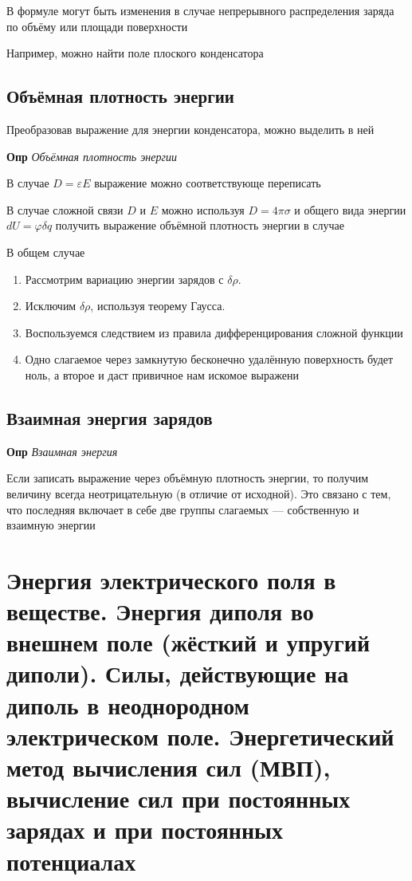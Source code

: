 \documentclass[a4paper, 14pt]{article}
\begin{document}
    В формуле могут быть изменения в случае непрерывного распределения заряда по объёму или площади поверхности
    
    Например, можно найти поле плоского конденсатора
    
    \subsection{Объёмная плотность энергии}
    
    Преобразовав выражение для энергии конденсатора, можно выделить в ней
    
    \textbf{Опр} \textit{Объёмная плотность энергии}
    
    В случае $D = \varepsilon E$ выражение можно соответствующе переписать
    
    В случае сложной связи $D$ и $E$ можно используя $D = 4 \pi \sigma$ и общего вида энергии $dU = \varphi \delta q$ получить выражение
    объёмной плотность энергии в случае
    
    В общем случае
    
    \begin{enumerate}
        \item Рассмотрим вариацию энергии зарядов с $\delta \rho$.
        \item Исключим $\delta \rho$, используя теорему Гаусса.
        \item Воспользуемся следствием из правила дифференцирования сложной функции
        \item Одно слагаемое через замкнутую бесконечно удалённую поверхность будет ноль, а второе и даст привичное
        нам искомое выражени
    \end{enumerate}
    
    \subsection{Взаимная энергия зарядов}
    
    \textbf{Опр} \textit{Взаимная энергия}
    
    Если записать выражение через объёмную плотность энергии, то получим величину всегда неотрицательную (в отличие
    от исходной).
    Это связано с тем, что последняя включает в себе две группы слагаемых --- собственную и взаимную энергии
    
    \section{Энергия электрического поля в веществе.
    Энергия диполя во внешнем поле (жёсткий и упругий диполи).
    Силы, действующие на диполь в неоднородном электрическом поле.
    Энергетический метод вычисления сил (МВП), вычисление сил при постоянных зарядах и при постоянных потенциалах}
    
\end{document}

